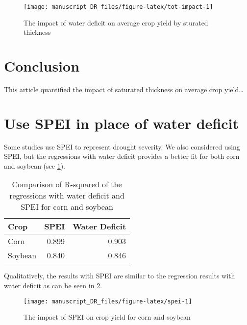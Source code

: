 \documentclass[
]{article}
\begin{document}
\begin{figure}

{\centering \texttt{[image: manuscript\_DR\_files/figure-latex/tot-impact-1]} 

}

\caption{The impact of water deficit on average crop yield by sturated thickness}\label{fig:tot-impact}
\end{figure}

\hypertarget{conclusion}{%
\section{Conclusion}\label{conclusion}}

This article quantified the impact of saturated thickness on average crop yield\ldots{}

\clearpage

\hypertarget{appendix-appendix}{%
\appendix}


\hypertarget{use-spei-in-place-of-water-deficit}{%
\section{Use SPEI in place of water deficit}\label{use-spei-in-place-of-water-deficit}}

Some studies use SPEI to represent drought severity. We also considered using SPEI, but the regressions with water deficit provides a better fit for both corn and soybean (see \ref{tab:fit-reg}).

\begin{table}[!h]

\caption{\label{tab:fit-reg}Comparison of R-squared of the regressions with water deficit and SPEI for corn and soybean}
\centering
\begin{tabular}[t]{lrr}
\toprule
Crop & SPEI & Water Deficit\\
\midrule
Corn & 0.899 & 0.903\\
Soybean & 0.840 & 0.846\\
\bottomrule
\end{tabular}
\end{table}

Qualitatively, the results with SPEI are similar to the regression results with water deficit as can be seen in \ref{fig:spei}.

\begin{figure}

{\centering \texttt{[image: manuscript\_DR\_files/figure-latex/spei-1]} 

}

\caption{The impact of SPEI on crop yield for corn and soybean}\label{fig:spei}
\end{figure}

\clearpage

  
\end{document}
